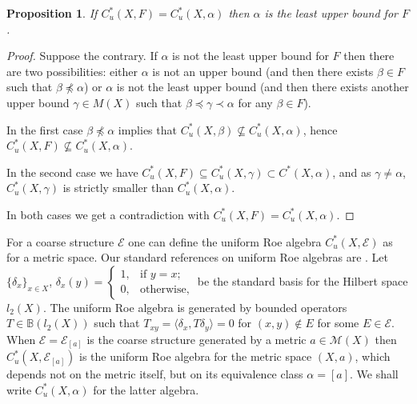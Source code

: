 \documentclass[reqno,12pt]{amsart}
\theoremstyle{plain}%
\newtheorem{prop}[thm]{Proposition}
\theoremstyle{definition}
\theoremstyle{remark}
\numberwithin{equation}{section}
\begin{document}
\begin{prop}\label{Prop}
If $C^*_u(X,F)=C^*_u(X,\alpha)$ then $\alpha$ is the least upper bound for $F$.

\end{prop}
\begin{proof}
Suppose the contrary. If $\alpha$ is not the least upper bound for $F$ then there are two possibilities: either $\alpha$ is not an upper bound (and then there exists $\beta\in F$ such that $\beta\npreceq \alpha$) or $\alpha$ is not the least upper bound (and then there exists another upper bound $\gamma\in M(X)$ such that $\beta\preceq \gamma\prec \alpha$ for any $\beta\in F$).

In the first case $\beta\npreceq \alpha$ implies that $C^*_u(X,\beta)\nsubseteq C^*_u(X,\alpha)$, hence $C^*_u(X,F)\nsubseteq C^*_u(X,\alpha)$.

In the second case we have $C^*_u(X,F)\subseteq C^*_u(X,\gamma)\subset C^*(X,\alpha)$, and as $\gamma\neq \alpha$, $C^*_u(X,\gamma)$ is strictly smaller than $C^*_u(X,\alpha)$. 

In both cases we get a contradiction with $C^*_u(X,F)=C^*_u(X,\alpha)$. 
\end{proof}




For a coarse structure $\mathcal E$ one can define the uniform Roe algebra $C^*_u(X,\mathcal E)$ as for a metric space. Our standard references on uniform Roe algebras are \cite{Roe,Nowak-Yu}. Let $\{\delta_x\}_{x\in X}$, $\delta_x(y)=\left\lbrace\begin{array}{cl}1,&\mbox{if\ }y=x;\\0,&\mbox{otherwise,}\end{array}\right.$ be the standard basis for the Hilbert space $l_2(X)$. The uniform Roe algebra is generated by bounded operators $T\in\mathbb B(l_2(X))$ such that $T_{xy}=\langle\delta_x,T\delta_y\rangle=0$ for $(x,y)\notin E$ for some $E\in\mathcal E$. When $\mathcal E=\mathcal E_[a]$ is the coarse structure generated by a metric $a\in\mathcal M(X)$ then $C^*_u(X,\mathcal E_[a])$ is the uniform Roe algebra for the metric space $(X,a)$, which depends not on the metric itself, but on its equivalence class $\alpha=[a]$. We shall write $C^*_u(X,\alpha)$ for the latter algebra. 
\end{document}
